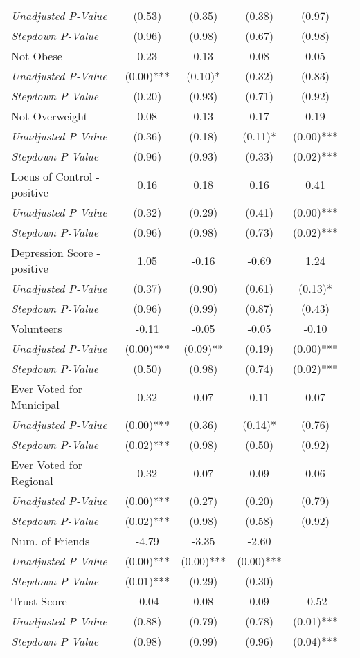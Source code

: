 \begin{tabular}{l c c c c c}
\quad \textit{Unadjusted P-Value} & (0.53) & (0.35) & (0.38) & (0.97) & \\
\quad \textit{Stepdown P-Value} & (0.96) & (0.98) & (0.67) & (0.98) & \\
Not Obese & 0.23 & 0.13 & 0.08 & 0.05 & \\
\quad \textit{Unadjusted P-Value} & (0.00)*** & (0.10)* & (0.32) & (0.83) & \\
\quad \textit{Stepdown P-Value} & (0.20) & (0.93) & (0.71) & (0.92) & \\
Not Overweight & 0.08 & 0.13 & 0.17 & 0.19 & \\
\quad \textit{Unadjusted P-Value} & (0.36) & (0.18) & (0.11)* & (0.00)*** & \\
\quad \textit{Stepdown P-Value} & (0.96) & (0.93) & (0.33) & (0.02)*** & \\
Locus of Control - positive & 0.16 & 0.18 & 0.16 & 0.41 & \\
\quad \textit{Unadjusted P-Value} & (0.32) & (0.29) & (0.41) & (0.00)*** & \\
\quad \textit{Stepdown P-Value} & (0.96) & (0.98) & (0.73) & (0.02)*** & \\
Depression Score - positive & 1.05 & -0.16 & -0.69 & 1.24 & \\
\quad \textit{Unadjusted P-Value} & (0.37) & (0.90) & (0.61) & (0.13)* & \\
\quad \textit{Stepdown P-Value} & (0.96) & (0.99) & (0.87) & (0.43) & \\
Volunteers & -0.11 & -0.05 & -0.05 & -0.10 & \\
\quad \textit{Unadjusted P-Value} & (0.00)*** & (0.09)** & (0.19) & (0.00)*** & \\
\quad \textit{Stepdown P-Value} & (0.50) & (0.98) & (0.74) & (0.02)*** & \\
Ever Voted for Municipal & 0.32 & 0.07 & 0.11 & 0.07 & \\
\quad \textit{Unadjusted P-Value} & (0.00)*** & (0.36) & (0.14)* & (0.76) & \\
\quad \textit{Stepdown P-Value} & (0.02)*** & (0.98) & (0.50) & (0.92) & \\
Ever Voted for Regional & 0.32 & 0.07 & 0.09 & 0.06 & \\
\quad \textit{Unadjusted P-Value} & (0.00)*** & (0.27) & (0.20) & (0.79) & \\
\quad \textit{Stepdown P-Value} & (0.02)*** & (0.98) & (0.58) & (0.92) & \\
Num. of Friends & -4.79 & -3.35 & -2.60 & & \\
\quad \textit{Unadjusted P-Value} & (0.00)*** & (0.00)*** & (0.00)*** & & \\
\quad \textit{Stepdown P-Value} & (0.01)*** & (0.29) & (0.30) & & \\
Trust Score & -0.04 & 0.08 & 0.09 & -0.52 & \\
\quad \textit{Unadjusted P-Value} & (0.88) & (0.79) & (0.78) & (0.01)*** & \\
\quad \textit{Stepdown P-Value} & (0.98) & (0.99) & (0.96) & (0.04)*** & \\
\bottomrule
\end{tabular}
